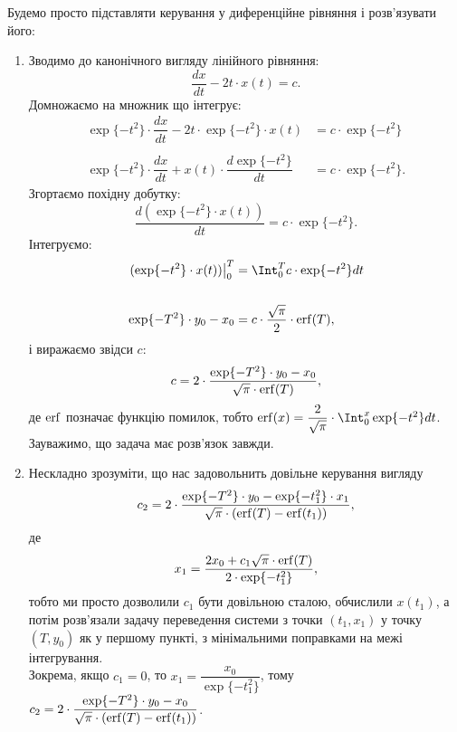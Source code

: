 \begin{solution}
Будемо просто підставляти керування у диференційне рівняння і розв'язувати його:
\begin{enumerate}
\item Зводимо до канонічного вигляду лінійного рівняння:
\[ \dfrac{dx}{dt} - 2t \cdot x(t) = c. \]
Домножаємо на множник що інтегрує:
\begin{align*}
    \exp\{-t^2\} \cdot \dfrac{dx}{dt} - 2 t \cdot \exp\{-t^2\} \cdot x(t) &= c \cdot \exp\{-t^2\} \\
    \\
    \exp\{-t^2\} \cdot \dfrac{dx}{dt} + x(t) \cdot \dfrac {d \exp\{-t^2\}} {dt} &= c \cdot \exp\{-t^2\}.
\end{align*}
Згортаємо похідну добутку:
\[ \dfrac {d (\exp\{-t^2\} \cdot x(t))} {dt} = c \cdot \exp\{-t^2\}. \]
Інтегруємо:
\begin{align*}
    \left.(\exp\{-t^2\} \cdot x(t))\right|_0^T &= \Int_0^T c \cdot \exp\{-t^2\} dt \\
    \\
    \exp\{-T^2\} \cdot y_0 - x_0 &= c \cdot \dfrac {\sqrt \pi} 2 \cdot \erf (T),
\end{align*}
і виражаємо звідси $c$:
\[ c = 2 \cdot \dfrac{\exp\{-T^2\} \cdot y_0 - x_0} {\sqrt \pi \cdot \operatorname{erf} (T)}, \]
де $\operatorname{erf}$ позначає функцію помилок, тобто $\erf(x) = \dfrac 2 {\sqrt \pi} \cdot \Int_0^x \exp\{-t^2\} dt$.\\

Зауважимо, що задача має розв'язок завжди.
\item Нескладно зрозуміти, що нас задовольнить довільне керування вигляду
\[ c_2 = 2 \cdot \dfrac{\exp\{-T^2\} \cdot y_0 - \exp\{-t_1^2\} \cdot x_1} {\sqrt \pi \cdot (\operatorname{erf} (T) - \operatorname{erf} (t_1))},\] де \[ x_1 = \dfrac{2x_0 + c_1\sqrt \pi \cdot \operatorname{erf} (T)}{2\cdot \exp\{-t_1^2\}}, \]
тобто  ми просто дозволили $c_1$ бути довільною сталою, обчислили $x(t_1)$, а потім розв'язали задачу переведення системи з точки $(t_1, x_1)$ у точку $(T, y_0)$ як у першому пункті, з мінімальними поправками на межі інтегрування. \\

Зокрема, якщо $c_1 = 0$, то $x_1 = \dfrac {x_0} {\exp\{-t_1^2\}}$, тому $c_2 = 2 \cdot \dfrac{\exp\{-T^2\} \cdot y_0 - x_0} {\sqrt \pi \cdot (\operatorname{erf} (T) - \operatorname{erf} (t_1))}$.\\


\end{enumerate}
\end{solution}
